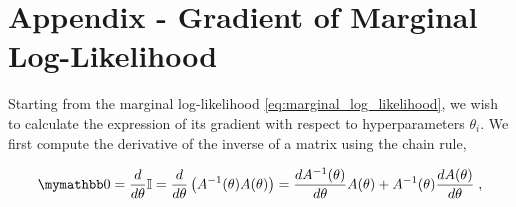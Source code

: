 \documentclass{article}
\begin{document}

\clearpage
\newpage
\printbibliography


\newpage
\appendix
\appendixpage

\section{Appendix - Gradient of Marginal Log-Likelihood} \label{sec:marginal_log_likelihood_gradient}

Starting from the marginal log-likelihood \eqref{eq:marginal_log_likelihood}, we wish to calculate the expression of its gradient with respect to hyperparameters $\theta_i$. We first compute the derivative of the inverse of a matrix using the chain rule,

\begin{equation*}
    \mymathbb 0 = \frac{d}{d \theta} \Id = \frac{d}{d \theta} \left( A^{-1}(\theta) A(\theta) \right) = \frac{d A^{-1}(\theta)}{d \theta} A(\theta) + A^{-1}(\theta) \frac{d A(\theta)}{d \theta}
     \;,
\end{equation*}
\end{document}
